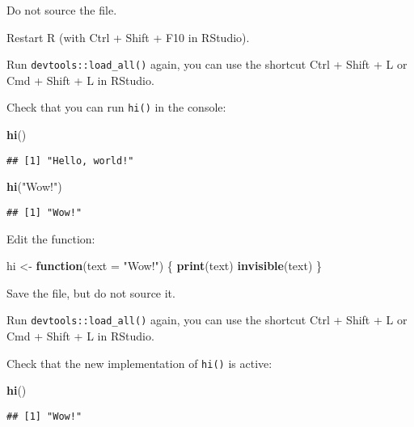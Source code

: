 \documentclass[]{book}
\newenvironment{Shaded}{\begin{snugshade}}{\end{snugshade}}
\newcommand{\ControlFlowTok}[1]{\textcolor[rgb]{0.13,0.29,0.53}{\textbf{#1}}}
\newcommand{\DataTypeTok}[1]{\textcolor[rgb]{0.13,0.29,0.53}{#1}}
\newcommand{\KeywordTok}[1]{\textcolor[rgb]{0.13,0.29,0.53}{\textbf{#1}}}
\newcommand{\NormalTok}[1]{#1}
\newcommand{\StringTok}[1]{\textcolor[rgb]{0.31,0.60,0.02}{#1}}
\begin{document}
Do not source the file.

Restart R (with Ctrl + Shift + F10 in RStudio).

Run \texttt{devtools::load\_all()} again, you can use the shortcut Ctrl + Shift + L or Cmd + Shift + L in RStudio.

Check that you can run \texttt{hi()} in the console:

\begin{Shaded}
\begin{Highlighting}[]
\KeywordTok{hi}\NormalTok{()}
\end{Highlighting}
\end{Shaded}

\begin{verbatim}
## [1] "Hello, world!"
\end{verbatim}

\begin{Shaded}
\begin{Highlighting}[]
\KeywordTok{hi}\NormalTok{(}\StringTok{"Wow!"}\NormalTok{)}
\end{Highlighting}
\end{Shaded}

\begin{verbatim}
## [1] "Wow!"
\end{verbatim}

Edit the function:

\begin{Shaded}
\begin{Highlighting}[]
\NormalTok{hi <-}\StringTok{ }\ControlFlowTok{function}\NormalTok{(}\DataTypeTok{text =} \StringTok{"Wow!"}\NormalTok{) \{}
  \KeywordTok{print}\NormalTok{(text)}
  \KeywordTok{invisible}\NormalTok{(text)}
\NormalTok{\}}
\end{Highlighting}
\end{Shaded}

Save the file, but do not source it.

Run \texttt{devtools::load\_all()} again, you can use the shortcut Ctrl + Shift + L or Cmd + Shift + L in RStudio.

Check that the new implementation of \texttt{hi()} is active:

\begin{Shaded}
\begin{Highlighting}[]
\KeywordTok{hi}\NormalTok{()}
\end{Highlighting}
\end{Shaded}

\begin{verbatim}
## [1] "Wow!"
\end{verbatim}
\end{document}
